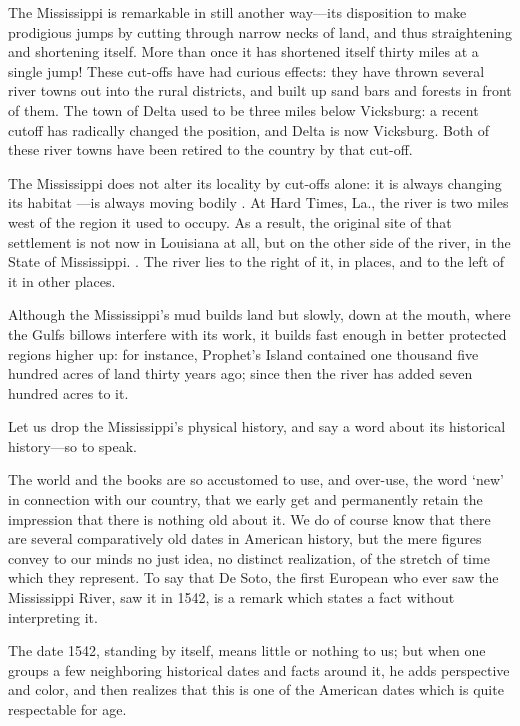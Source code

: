 \documentclass{novelette} %
\begin{document}
The Mississippi is remarkable in still another way---its disposition to
make prodigious jumps by cutting through narrow necks of land, and thus
straightening and shortening itself. More than once it has shortened
itself thirty miles at a single jump! These cut-offs have had curious
effects: they have thrown several river towns out into the rural
districts, and built up sand bars and forests in front of them. The town
of Delta used to be three miles below Vicksburg: a recent cutoff has
radically changed the position, and Delta is now 
Vicksburg. Both of these river towns have been retired to the country by that
cut-off.

The Mississippi does not alter its locality by cut-offs alone: it
is always changing its habitat ---is always moving bodily
. At Hard Times, La., the river is two miles west of the
region it used to occupy. As a result, the original site of that
settlement is not now in Louisiana at all, but on the other side of
the river, in the State of Mississippi. . The river lies to the right of it, in places, and to the
left of it in other places.

Although the Mississippi's mud builds land but slowly, down at the
mouth, where the Gulfs billows interfere with its work, it builds fast
enough in better protected regions higher up: for instance, Prophet's
Island contained one thousand five hundred acres of land thirty years
ago; since then the river has added seven hundred acres to it.


Let us drop the Mississippi's physical history, and say a word about its
historical history---so to speak.

The world and the books are so accustomed to use, and over-use, the word
`new' in connection with our country, that we early get and permanently
retain the impression that there is nothing old about it. We do of
course know that there are several comparatively old dates in American
history, but the mere figures convey to our minds no just idea, no
distinct realization, of the stretch of time which they represent.
To say that De Soto, the first European who ever saw the Mississippi
River, saw it in 1542, is a remark which states a fact without
interpreting it.

The date 1542, standing by itself, means little or nothing to us; but
when one groups a few neighboring historical dates and facts around it,
he adds perspective and color, and then realizes that this is one of the
American dates which is quite respectable for age.
\end{document}
